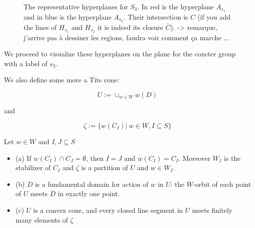 \begin{figure}
  \begin{center}
\end{center}
\caption{The representative hyperplanes for $S_3$. In red is the hyperplane $A_{s_1}$ and in blue is the hyperplane $A_{s_2}$. Their intersection is $C$ (if you add the lines of $H_{s_1}$ and $H_{s_2}$ it is indeed its closure $\bar{C}$). -> remarque, j'arrive pas à dessiner les regions, faudra voir comment ça marche ...}
\label{fig:hyper}
\end{figure}

\begin{example}
    We proceed to visualize these hyperplanes on the plane for the coxeter group  with a label of $s_3$.
\end{example}


We also define some more a Tits cone:

\begin{equation}
  U:= \cup_{w\in W} w (D)
\end{equation}

and

\begin{equation}
  \zeta := \{w(C_I)|\ w\in W, I \subseteq S\}
\end{equation}

\begin{theorem}
  \label{theo:stabilizer}
Let $w \in W$ and $I,J \subseteq S$
  \begin{itemize}
    \item (a) If $w (C_I) \cap C_J = \emptyset$, then $I = J$ and $w(C_I) = C_I$. Moreover $W_I$ is the stabilizer of $C_I$ and $\zeta$ is a partition of $U$ and $w \in W_I$.
    \item (b) $D$ is a fundamental domain for action of $w$ in $U$: the $W$-orbit of each point of $U$ meets $D$ in exactly one point.
    \item (c) $U$ is a convex cone, and every closed line segment in $U$ meets finitely many elements of $\zeta$
  \end{itemize}
\end{theorem}

